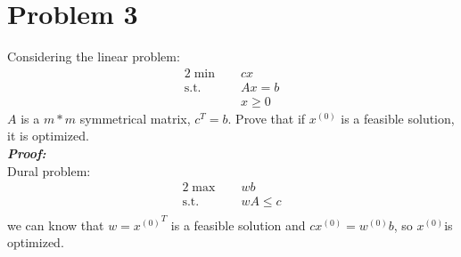 \documentclass[paper=a4, fontsize=11pt]{scrartcl} %
\numberwithin{equation}{section} %
\numberwithin{figure}{section} %
\numberwithin{table}{section} %
\begin{document}
\section{Problem 3}
Considering the linear problem:
\begin{alignat}{2}          \nonumber
\min\quad & cx \\    \nonumber
\mbox{s.t.}\quad            \nonumber
& Ax=b\\        \nonumber
& x \geq 0
\end{alignat}
$A$ is a $m*m$ symmetrical matrix, $c^T=b$. Prove that if $x^{(0)}$ is a feasible solution, it is optimized.\\
\emph{\textbf{Proof:}}\\
Dural problem:
\begin{alignat}{2}          \nonumber
\max\quad & wb \\    \nonumber
\mbox{s.t.}\quad & wA \leq c\\        \nonumber
\end{alignat}
we can know that $w={x^{(0)}}^T$ is a feasible solution and $c{x^(0)}=w^{(0)}b$, so $x^{(0)}$is optimized.
\end{document}
